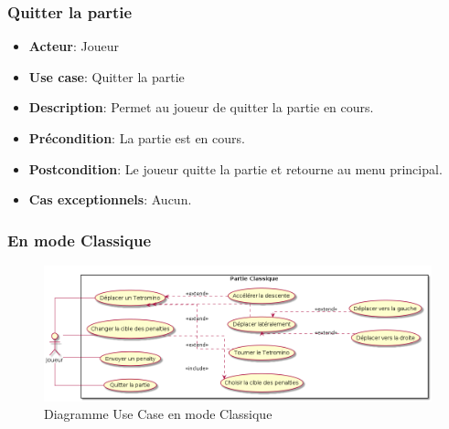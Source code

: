 \documentclass{article}
\begin{document}

\subsubsection*{Quitter la partie}
\begin{itemize}
    \item \textbf{Acteur}: Joueur
    \item \textbf{Use case}: Quitter la partie
    \item \textbf{Description}: Permet au joueur de quitter la partie en cours.
    \item \textbf{Précondition}: La partie est en cours.
    \item \textbf{Postcondition}: Le joueur quitte la partie et retourne au menu principal.
    \item \textbf{Cas exceptionnels}: Aucun.
\end{itemize}

\subsubsection{En mode Classique}

\begin{figure}[!h]
    \centering
    \includegraphics[width=1\textwidth]{../../res/uml/usecase/ClassicUseCase.png}
    \caption{Diagramme Use Case en mode Classique}
    \label{fig:Endless}
\end{figure}
\end{document}
